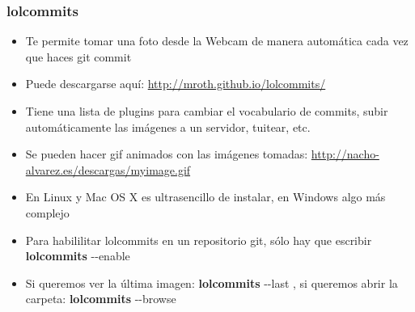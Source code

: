 \frame
{
\frametitle{lolcommits}
 \begin{itemize}
  \item Te permite tomar una foto desde la Webcam de manera automática cada vez que haces git commit
  \item Puede descargarse aquí: \url{http://mroth.github.io/lolcommits/}
  \item Tiene una lista de plugins para cambiar el vocabulario de commits, subir automáticamente las imágenes a un servidor, tuitear, etc.
  \item Se pueden hacer gif animados con las imágenes tomadas: \url{http://nacho-alvarez.es/descargas/myimage.gif}
  \item En Linux y Mac OS X es ultrasencillo de instalar, en Windows algo más complejo
  \item Para habililitar lolcommits en un repositorio git, sólo hay que escribir \textbf{lolcommits} -{}-enable
  \item Si queremos ver la última imagen: \textbf{lolcommits} -{}-last , si queremos abrir la carpeta: \textbf{lolcommits} -{}-browse
 \end{itemize}
}